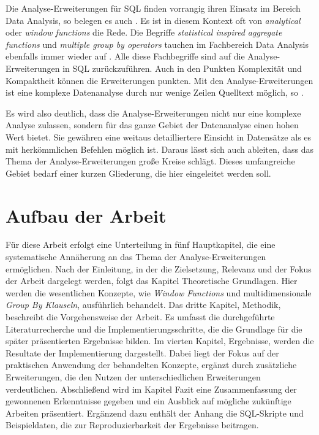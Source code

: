 Die Analyse-Erweiterungen für SQL finden vorrangig ihren Einsatz im Bereich Data
Analysis, so belegen es auch \citet[S. 245]{FOTACHE2015243}. Es ist in diesem Kontext
oft von \textit{analytical} oder \textit{window functions} die Rede. Die
Begriffe \textit{statistical inspired aggregate functions} und \textit{multiple
group by operators} tauchen im Fachbereich Data Analysis ebenfalls immer wieder
auf \citep[vgl.][S. 247 - 248]{FOTACHE2015243}. Alle diese Fachbegriffe sind auf
die Analyse-Erweiterungen in SQL zurückzuführen. Auch in den Punkten Komplexität
und Kompaktheit können die Erweiterungen punkten. Mit den Analyse-Erweiterungen
ist eine komplexe Datenanalyse durch nur wenige Zeilen Quelltext möglich, so \citet[K.
1]{Maue2022}.

Es wird also deutlich, dass die Analyse-Erweiterungen nicht nur eine komplexe Analyse
zulassen, sondern für das ganze Gebiet der Datenanalyse einen hohen Wert bietet.
Sie gewähren eine weitaus detailliertere Einsicht in Datensätze als es mit herkömmlichen
Befehlen möglich ist. Daraus lässt sich auch ableiten, dass das Thema der Analyse-Erweiterungen
große Kreise schlägt. Dieses umfangreiche Gebiet bedarf einer kurzen Gliederung,
die hier eingeleitet werden soll.

\section{Aufbau der Arbeit}
\label{sec:aufbau_der_arbeit} Für diese Arbeit erfolgt eine Unterteilung in fünf
Hauptkapitel, die eine systematische Annäherung an das Thema der Analyse-Erweiterungen
ermöglichen. Nach der Einleitung, in der die Zielsetzung, Relevanz und der Fokus
der Arbeit dargelegt werden, folgt das Kapitel Theoretische Grundlagen. Hier werden
die wesentlichen Konzepte, wie \textit{Window Functions} und multidimensionale \textit{Group
By Klauseln}, ausführlich behandelt. Das dritte Kapitel, Methodik, beschreibt
die Vorgehensweise der Arbeit. Es umfasst die durchgeführte Literaturrecherche und
die Implementierungsschritte, die die Grundlage für die später präsentierten
Ergebnisse bilden. Im vierten Kapitel, Ergebnisse, werden die Resultate der Implementierung
dargestellt. Dabei liegt der Fokus auf der praktischen Anwendung der behandelten
Konzepte, ergänzt durch zusätzliche Erweiterungen, die den Nutzen der
unterschiedlichen Erweiterungen verdeutlichen. Abschließend wird im Kapitel Fazit
eine Zusammenfassung der gewonnenen Erkenntnisse gegeben und ein Ausblick auf mögliche
zukünftige Arbeiten präsentiert. Ergänzend dazu enthält der Anhang die SQL-Skripte
und Beispieldaten, die zur Reproduzierbarkeit der Ergebnisse beitragen.

